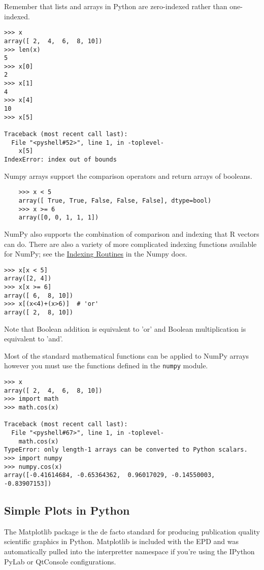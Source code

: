\documentclass{article}
\begin{document}
Remember that lists and arrays in Python are zero-indexed rather than
one-indexed.

\begin{lstlisting}
>>> x
array([ 2,  4,  6,  8, 10])
>>> len(x)
5
>>> x[0]
2
>>> x[1]
4
>>> x[4]
10
>>> x[5]

Traceback (most recent call last):
  File "<pyshell#52>", line 1, in -toplevel-
    x[5]
IndexError: index out of bounds
\end{lstlisting}
Numpy arrays support the comparison operators and return arrays of
booleans.

\begin{lstlisting}
    >>> x < 5 
    array([ True, True, False, False, False], dtype=bool)
    >>> x >= 6 
    array([0, 0, 1, 1, 1])
\end{lstlisting}
NumPy also supports the combination of comparison and indexing that R
vectors can do. There are also a variety of more complicated indexing
functions available for NumPy; see the
\href{http://docs.scipy.org/doc/numpy/reference/routines.indexing.html}{Indexing
Routines} in the Numpy docs.

\begin{lstlisting}
>>> x[x < 5]
array([2, 4])
>>> x[x >= 6]
array([ 6,  8, 10])
>>> x[(x<4)+(x>6)]  # 'or'
array([ 2,  8, 10])
\end{lstlisting}
Note that Boolean addition is equivalent to 'or' and Boolean
multiplication is equivalent to 'and'.

Most of the standard mathematical functions can be applied to NumPy
arrays however you must use the functions defined in the
\lstinline!numpy! module.

\begin{lstlisting}
>>> x
array([ 2,  4,  6,  8, 10])
>>> import math
>>> math.cos(x)

Traceback (most recent call last):
  File "<pyshell#67>", line 1, in -toplevel-
    math.cos(x)
TypeError: only length-1 arrays can be converted to Python scalars.
>>> import numpy
>>> numpy.cos(x)
array([-0.41614684, -0.65364362,  0.96017029, -0.14550003, -0.83907153])
\end{lstlisting}
\subsection{Simple Plots in Python}

The Matplotlib package is the de facto standard for producing
publication quality scientific graphics in Python. Matplotlib is
included with the EPD and was automatically pulled into the interpretter
namespace if you're using the IPython PyLab or QtConsole configurations.
\end{document}
